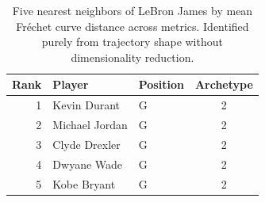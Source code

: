 \begin{table}[htbp]
  \centering\small
  \begin{tabular}{rllc}
    \toprule
    Rank & Player & Position & Archetype \\
    \midrule
    1 & Kevin Durant & G & 2 \\
    2 & Michael Jordan & G & 2 \\
    3 & Clyde Drexler & G & 2 \\
    4 & Dwyane Wade & G & 2 \\
    5 & Kobe Bryant & G & 2 \\
    \bottomrule
  \end{tabular}
  \caption{Five nearest neighbors of LeBron James by mean Fr\'{e}chet curve distance across metrics. Identified purely from trajectory shape without dimensionality reduction.}
  \label{tab:LeBron_James_frechet_curve_neighbors}
\end{table}

